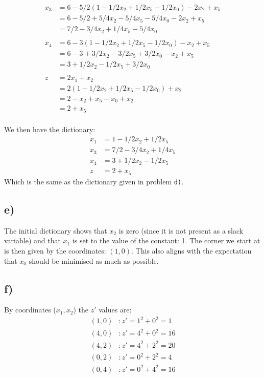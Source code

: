 \documentclass[12pt,a4paper]{article}
\begin{document}
\begin{align*}
x_3 & = 6 - 5/2(1 - 1/2x_2 + 1/2x_5 - 1/2x_0) - 2x_2 + x_5 \\
    & = 6 - 5/2 + 5/4x_2 - 5/4x_5 - 5/4x_0 - 2x_2 + x_5 \\
    & = 7/2 - 3/4x_2 + 1/4x_5 - 5/4x_0 \\
\\
x_4 & = 6 - 3(1 - 1/2x_2 + 1/2x_5 - 1/2x_0) - x_2 + x_5 \\
    & = 6 - 3 + 3/2x_2 - 3/2x_5 + 3/2x_0 - x_2 + x_5 \\
    & = 3 + 1/2x_2 - 1/2x_5 + 3/2x_0 \\
\\
z & = 2x_1 + x_2 \\
  & = 2(1 - 1/2x_2 + 1/2x_5 - 1/2x_0) + x_2 \\
  & = 2 - x_2 + x_5 - x_0 + x_2 \\
  & = 2 + x_5 \\
\end{align*}

We then have the dictionary:
\begin{align*}
x_1 & = 1 - 1/2x_2 + 1/2x_5 \\
x_3 & = 7/2 - 3/4x_2 + 1/4x_5 \\
x_4 & = 3 + 1/2x_2 - 1/2x_5 \\
z   & = 2 + x_5
\end{align*}
Which is the same as the dictionary given in problem \texttt{d)}. 

\subsection*{e)}
The initial dictionary shows that $x_2$ is zero (since it is not present as
a slack variable) and that $x_1$ is set to the value of the constant: 1. The
corner we start at is then given by the coordinates: $(1, 0)$. This also
aligns with the expectation that $x_0$ should be minimised as much as possible.

\subsection*{f)}
By coordinates ($x_1, x_2$) the $z'$ values are:
\begin{align*}
(1, 0) &: z' = 1^2 + 0^2 = 1 \\
(4, 0) &: z' = 4^2 + 0^2 = 16 \\
(4, 2) &: z' = 4^2 + 2^2 = 20 \\
(0, 2) &: z' = 0^2 + 2^2 = 4 \\
(0, 4) &: z' = 0^2 + 4^2 = 16 \\
\end{align*}
\end{document}
